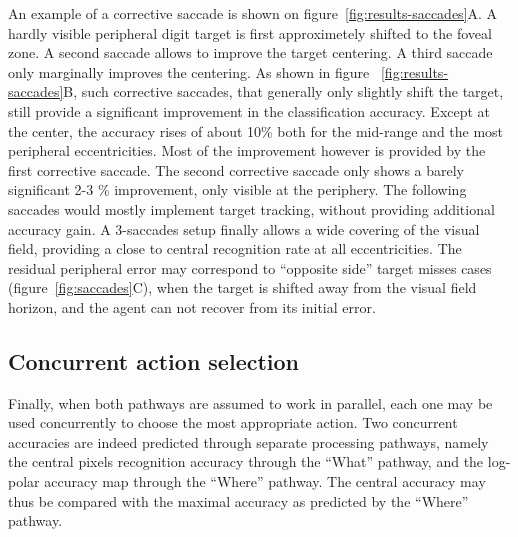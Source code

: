 An example of a corrective saccade is shown on figure~\ref{fig:results-saccades}A. A hardly visible peripheral digit target is first approximetely shifted to the foveal zone. A second saccade allows to improve the target centering. A third saccade only marginally improves the centering.
As shown in figure ~\ref{fig:results-saccades}B, such corrective saccades, that generally only slightly shift the target, still provide a significant improvement in the classification accuracy. Except at the center, the accuracy rises of about 10\% both for the mid-range and the most peripheral eccentricities. Most of the improvement however is provided by the first corrective saccade. The second corrective saccade only shows a barely significant 2-3 \% improvement, only visible at the periphery. The following saccades would mostly implement target tracking, without providing additional accuracy gain. A 3-saccades setup finally allows a wide covering of the visual field, providing a close to central  recognition rate at all eccentricities. The residual peripheral error may correspond to ``opposite side'' target misses cases (figure~\ref{fig:saccades}C), when the target is shifted away from the visual field horizon, and the agent can not recover from its initial error.

\subsection{Concurrent action selection}


Finally, when both pathways are assumed to work in parallel, each one may be used concurrently to choose the most appropriate action. Two concurrent accuracies are indeed  predicted through separate processing pathways, namely the central pixels recognition accuracy through the ``What'' pathway, and the log-polar accuracy map through the ``Where'' pathway. The central accuracy may thus be compared with the maximal accuracy as predicted by the ``Where'' pathway.

